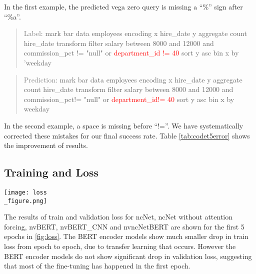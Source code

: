\documentclass[
	a4paper, %
	10pt, %
	unnumberedsections, %
	twoside, %
]{t0003}
\newcommand{\gray}[1]{\textcolor{gray}{#1}}
\newcommand{\red}[1]{\textcolor{red}{#1}}
\begin{document}
\begin{appendices}
In the first example, the predicted vega zero query is missing a ``\%'' sign after ``\%a''.

\begin{quote}
\gray{Label}: mark bar data employees encoding x hire\_date y aggregate count hire\_date transform filter salary between 8000 and 12000 and commission\_pct != "null" or \red{department\_id != 40} sort y asc bin x by 'weekday
\end{quote}

\begin{quote}
\gray{Prediction}: mark bar data employees encoding x hire\_date y aggregate count hire\_date transform filter salary between 8000 and 12000 and commission\_pct!= "null" or \red{department\_id!= 40} sort y asc bin x by weekday
\end{quote}

In the second example, a space is missing before ``!=''. We have systematically corrected these mistakes for our final success rate. Table \ref{tab:codet5error} shows the improvement of results.

\subsection{Training and Loss}

\begin{figure*}
	\texttt{[image: loss\\\_figure.png]}
	\caption{Train and validation loss of models.}
	\label{fig:loss}
\end{figure*}

The results of train and validation loss for ncNet, ncNet without attention forcing, nvBERT, nvBERT\_CNN and nvncNetBERT are shown for the first 5 epochs in \ref{fig:loss}. The BERT encoder models show much smaller drop in train loss from epoch to epoch, due to transfer learning that occurs. However the BERT encoder models do not show significant drop in validation loss, suggesting that most of the fine-tuning has happened in the first epoch.

\end{appendices}
\end{document}

